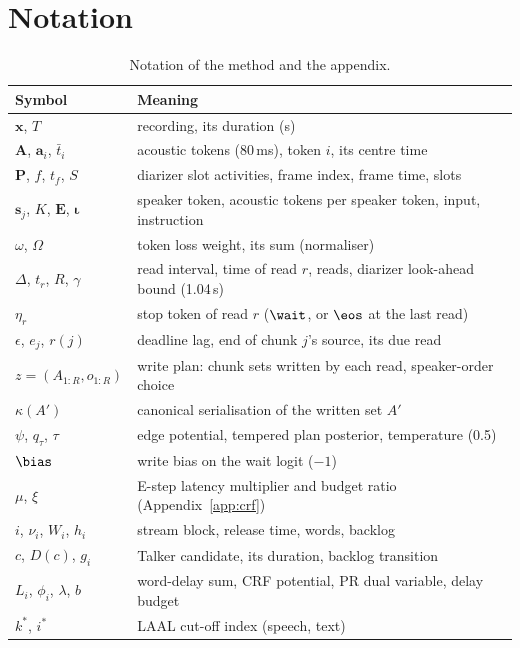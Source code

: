 
\section{Notation}
\label{app:notation}

\begin{table}[h]
\centering\footnotesize
\setlength{\tabcolsep}{3pt}
\begin{tabular}{@{}>{\raggedright\arraybackslash}p{2.2cm}>{\raggedright\arraybackslash}p{5.1cm}@{}}
\toprule
Symbol & Meaning \\
\midrule
$\bm{x}$, $T$ & recording, its duration (s) \\
$\bm{A}$, $\bm{a}_i$, $\bar{t}_i$ & acoustic tokens (80\,ms), token $i$, its centre time \\
$\bm{P}$, $f$, $t_f$, $S$ & diarizer slot activities, frame index, frame time, slots \\
$\bm{s}_j$, $K$, $\bm{E}$, $\bm{\iota}$ & speaker token, acoustic tokens per speaker token, input, instruction \\
$\omega$, $\Omega$ & token loss weight, its sum (normaliser) \\
$\Delta$, $t_r$, $R$, $\gamma$ & read interval, time of read $r$, reads, diarizer look-ahead bound (1.04\,s) \\
$\eta_r$ & stop token of read $r$ ($\wait$, or $\eos$ at the last read) \\
$\epsilon$, $e_j$, $r(j)$ & deadline lag, end of chunk $j$'s source, its due read \\
$z=(A_{1:R},o_{1:R})$ & write plan: chunk sets written by each read, speaker-order choice \\
$\kappa(A')$ & canonical serialisation of the written set $A'$ \\
$\psi$, $q_\tau$, $\tau$ & edge potential, tempered plan posterior, temperature (0.5) \\
$\bias$ & write bias on the wait logit ($-1$) \\
$\mu$, $\xi$ & E-step latency multiplier and budget ratio (Appendix~\ref{app:crf}) \\
$i$, $\nu_i$, $W_i$, $h_i$ & stream block, release time, words, backlog \\
$c$, $D(c)$, $g_i$ & Talker candidate, its duration, backlog transition \\
$L_i$, $\phi_i$, $\lambda$, $b$ & word-delay sum, CRF potential, PR dual variable, delay budget \\
$k^\ast$, $i^\ast$ & LAAL cut-off index (speech, text) \\
\bottomrule
\end{tabular}
\caption{Notation of the method and the appendix.}
\label{tab:notation}
\end{table}

